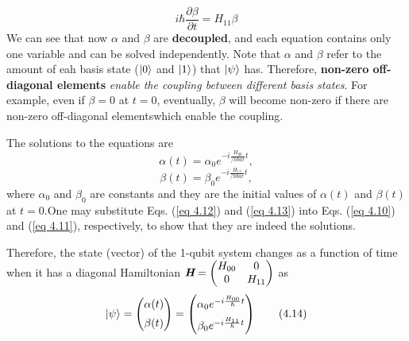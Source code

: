 \documentclass{article}
\begin{document}
\begin{equation} \label{eq 4.11}
    i\hbar\frac{\partial\beta}{\partial t}= H_{11}\beta\tag{4.11}
\end{equation}
We can see that now $\alpha$ and $\beta$ are \textbf{decoupled}, and each equation
contains only one variable and can be solved independently. Note that $\alpha$ and $\beta$ 
refer to the amount of eah basis state ($\ket{0}$ and $\ket{1}$) that $\ket{\psi}$ has.
Therefore, \textbf{non-zero off-diagonal elements} \textit{enable the coupling between different basis states}.
For example, even if $\beta = 0$ at $t=0$, eventually, $\beta$ will become non-zero if there are 
non-zero off-diagonal elementswhich enable the coupling.

The solutions to the equations are 
\begin{equation} \label{eq 4.12}
    \alpha(t)=\alpha_0e^{-i\frac{H_{00}}{/hbar}t},\tag{4.12}
\end{equation}
\begin{equation} \label{eq 4.13}
    \beta(t)=\beta_0e^{-i\frac{H_{11}}{/hbar}t},\tag{4.13}
\end{equation}
where $\alpha_{0}$ and $\beta_{0}$ are constants and they are the initial values of 
$\alpha(t)$ and $\beta(t)$ at $t=0$.One may substitute Eqs. (\ref{eq 4.12}) and (\ref{eq 4.13})
into Eqs. (\ref{eq 4.10}) and (\ref{eq 4.11}), respectively, to show that they are indeed the solutions.

Therefore, the state (vector) of the 1-qubit system changes as a function of time
when it has a diagonal Hamiltonian $\textit{\textbf{H}}=\begin{pmatrix}
    H_{00} & 0 \\ 0 & H_{11}
\end{pmatrix}$ as
\begin{equation} \label{eq 4.14}
    \ket{\psi}= \begin{pmatrix}
        \alpha(t)\\ \addlinespace \beta(t)
    \end{pmatrix}
    =\begin{pmatrix}
        \alpha_0e^{-i\frac{H_{00}}{\hbar}t}\\ \addlinespace
        \beta_0e^{-i\frac{H_{11}}{\hbar}t}        
    \end{pmatrix}\tag{4.14}
\end{equation}
\end{document}
